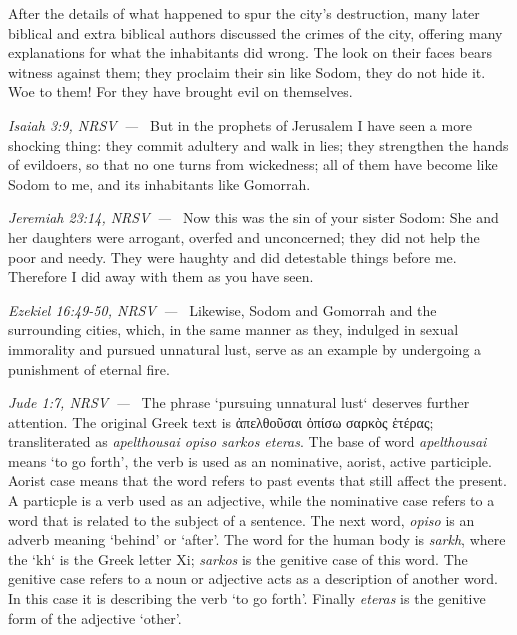\documentclass[10pt]{article}
\let\oldquote\quote
\let\endoldquote\endquote
\renewenvironment{quote}[2][]
  {\if\relax\detokenize{#1}\relax
     \def\quoteauthor{#2}%
   \else
     \def\quoteauthor{#2~---~#1}%
   \fi
   \oldquote}
  {\par\nobreak\smallskip\hfill\textit{\quoteauthor}%
   \endoldquote\addvspace{\bigskipamount}}
\begin{document}
After the details of what happened to spur the city's destruction, many later biblical and extra biblical authors discussed the crimes of the city, offering many explanations for what the inhabitants did wrong.
\begin{quote}{Isaiah 3:9, NRSV}
The look on their faces bears witness against them;
    they proclaim their sin like Sodom,
    they do not hide it.
Woe to them!
    For they have brought evil on themselves.
\end{quote}
\begin{quote}{Jeremiah 23:14, NRSV}
But in the prophets of Jerusalem
    I have seen a more shocking thing:
they commit adultery and walk in lies;
    they strengthen the hands of evildoers,
    so that no one turns from wickedness;
all of them have become like Sodom to me,
    and its inhabitants like Gomorrah.
\end{quote}
\begin{quote}{Ezekiel 16:49-50, NRSV}
Now this was the sin of your sister Sodom: She and her daughters were arrogant, overfed and unconcerned; they did not help the poor and needy. They were haughty and did detestable things before me. Therefore I did away with them as you have seen.
\end{quote}
\begin{quote}{Jude 1:7, NRSV}
Likewise, Sodom and Gomorrah and the surrounding cities, which, in the same manner as they, indulged in sexual immorality and pursued unnatural lust, serve as an example by undergoing a punishment of eternal fire.
\end{quote}
The phrase `pursuing unnatural lust` deserves further attention. The original Greek text is {\textgreekfont ἀπελθοῦσαι ὀπίσω σαρκὸς ἑτέρας}; transliterated as \textit{apelthousai opiso sarkos eteras}. The base of word \textit{apelthousai} means `to go forth', the verb is used as an nominative, aorist, active participle. Aorist case means that the word refers to past events that still affect the present. A particple is a verb used as an adjective, while the nominative case refers to a word that is related to the subject of a sentence.  
The next word, \textit{opiso} is an adverb meaning `behind' or `after'. The word for the human body is \textit{sarkh}, where the `kh` is the Greek letter Xi; \textit{sarkos} is the genitive case of this word. The genitive case refers to a noun or adjective acts as a description of another word. In this case it is describing the verb `to go forth'. Finally \textit{eteras} is the genitive form of the adjective `other'. 
\end{document}
